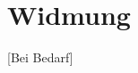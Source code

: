 \documentclass[Bachelorarbeit.tex]{subfiles}
\begin{document}
\chapter*{Widmung}
[Bei Bedarf]
\end{document}
